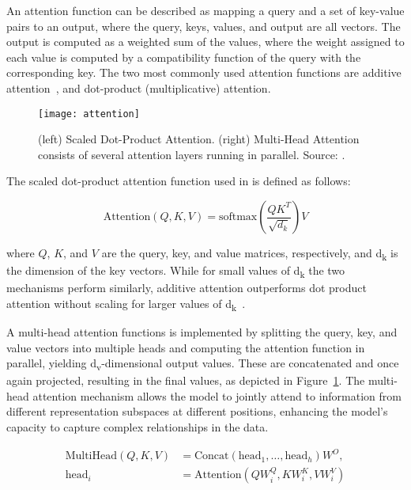 An attention function can be described as mapping a query and a set of key-value pairs to an output, where the query, keys, values, and output are all vectors.
The output is computed as a weighted sum of the values, where the weight assigned to each value is computed by a compatibility function of the query with the corresponding key.
The two most commonly used attention functions are additive attention~\cite{bahdanau2014neural}, and dot-product (multiplicative) attention.
\begin{figure}[h]
	\centering
	\texttt{[image: attention]}
	\caption{(left) Scaled Dot-Product Attention. (right) Multi-Head Attention consists of several attention layers running in parallel. Source: \textcite{vaswani2023attention}.}
	\label{fig:attention}
\end{figure}
The scaled dot-product attention function used in \textcite{vaswani2023attention} is defined as follows:

\begin{equation}
	\text{Attention}(Q, K, V) = \text{softmax}\left(\frac{QK^T}{\sqrt{d_k}}\right)V
	\label{eq:dot-scaled-attention}
\end{equation}

\noindent where \(Q\), \(K\), and \(V\) are the query, key, and value matrices, respectively, and d\textsubscript{k} is the dimension of the key vectors.
While for small values of d\textsubscript{k} the two mechanisms perform similarly, additive attention outperforms dot product attention without scaling for larger values of d\textsubscript{k}~\cite{britz2017massive}.

A multi-head attention functions is implemented by splitting the query, key, and value vectors into multiple heads and computing the attention function in parallel, yielding d\textsubscript{v}-dimensional output values.
These are concatenated and once again projected, resulting in the final values, as depicted in Figure~\ref{fig:attention}.
The multi-head attention mechanism allows the model to jointly attend to information from different representation subspaces at different positions, enhancing the model's capacity to capture complex relationships in the data.

\begin{equation}
	\begin{aligned}
		\text{MultiHead}(Q, K, V) & = \text{Concat}(\text{head}_1, \ldots, \text{head}_h)W^O, \\
		\text{head}_i             & = \text{Attention}(QW_i^Q, KW_i^K, VW_i^V)
	\end{aligned}
	\label{eq:multihead-attention}
\end{equation}

